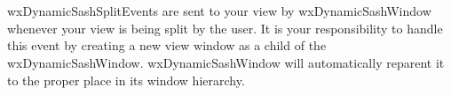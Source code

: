 %
%


\section{}\label{wxdynamicsashsplitevent}


wxDynamicSashSplitEvents are sent to your view by wxDynamicSashWindow
    whenever your view is being split by the user.  It is your
    responsibility to handle this event by creating a new view window as
    a child of the wxDynamicSashWindow.  wxDynamicSashWindow will
    automatically reparent it to the proper place in its window hierarchy.






\label{wxdynamicsashspliteventwxdynamicsashsplitevent}







\label{wxdynamicsashspliteventclone}


